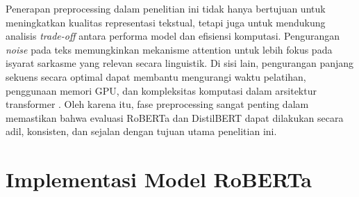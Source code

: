 Penerapan preprocessing dalam penelitian ini tidak hanya bertujuan untuk meningkatkan kualitas representasi tekstual, tetapi juga untuk mendukung analisis \textit{trade-off} antara performa model dan efisiensi komputasi. Pengurangan \textit{noise} pada teks memungkinkan mekanisme attention untuk lebih fokus pada isyarat sarkasme yang relevan secara linguistik. Di sisi lain, pengurangan panjang sekuens secara optimal dapat membantu mengurangi waktu pelatihan, penggunaan memori GPU, dan kompleksitas komputasi dalam arsitektur transformer \cite{dubey2025unpacking}. Oleh karena itu, fase preprocessing sangat penting dalam memastikan bahwa evaluasi RoBERTa dan DistilBERT dapat dilakukan secara adil, konsisten, dan sejalan dengan tujuan utama penelitian ini.

\section{Implementasi Model RoBERTa}


